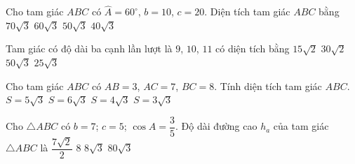 \begin{ex}%
	Cho tam giác $ABC$  có $\widehat{A}=60^\circ$, $b=10$, $c=20$. Diện tích tam giác $ABC$ bằng
	 \choice
		{$70\sqrt{3}$} 
		 {$60\sqrt{3}$}
		{\True  $50\sqrt{3}$}
		{$40\sqrt{3}$} 
\end{ex}

\begin{ex}%
	Tam giác  có độ dài ba cạnh lần lượt là $9$, $10$, $11$ có diện tích bằng
	\choice 
		 {$15\sqrt{2}$}
		{\True $30\sqrt{2}$} 
		{$50\sqrt{3}$} 
		 {$25\sqrt{3}$}
\end{ex}

\begin{ex}%
	Cho tam giác $ABC$ có $AB=3$, $AC=7$, $BC=8$. Tính  diện tích tam giác $ABC$.
	 \choice
		{$S=5\sqrt{3}$} 
		{\True  $S=6\sqrt{3}$}
		 {$S=4\sqrt{3}$}
		 {$S=3\sqrt{3}$}
\end{ex}

\begin{ex}%
	Cho $\triangle ABC$ có $b=7$; $c=5$; $\cos A=\dfrac{3}{5}$. Độ  dài đường cao $h_a$ của tam giác $\triangle ABC$ là
	\choice 
		 {\True $\dfrac{7\sqrt{2}}{2}$}
		 {$8$}
		{$8\sqrt{3}$} 
		{$80\sqrt{3}$} 
\end{ex}

